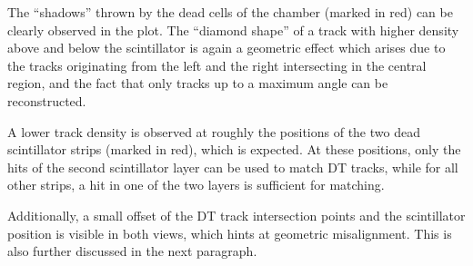 \par The \enquote{shadows} thrown by the dead cells of the chamber (marked in red) can be clearly observed in the plot. The \enquote{diamond shape} of a track with higher density above and below the scintillator is again a geometric effect which arises due to the tracks originating from the left and the right intersecting in the central region, and the fact that only tracks up to a maximum angle can be reconstructed.
\par A lower track density is observed at roughly the positions of the two dead scintillator strips (marked in red), which is expected. At these positions, only the hits of the second scintillator layer can be used to match \ac{DT} tracks, while for all other strips, a hit in one of the two layers is sufficient for matching.
\par Additionally, a small offset of the \ac{DT} track intersection points and the scintillator position is visible in both views, which hints at geometric misalignment. This is also further discussed in the next paragraph.
